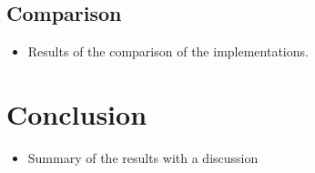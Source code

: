 \documentclass[onecolumn, conference]{IEEEtran}
\newcommand{\conciseItem}{\itemsep1pt \parskip0pt \parsep0pt}
\begin{document}
\subsection{Comparison}
\begin{itemize}
	\conciseItem
	\item Results of the comparison of the implementations.
\end{itemize}


\section{Conclusion}
\begin{itemize}
	\conciseItem
	\item Summary of the results with a discussion
\end{itemize}
\end{document}
